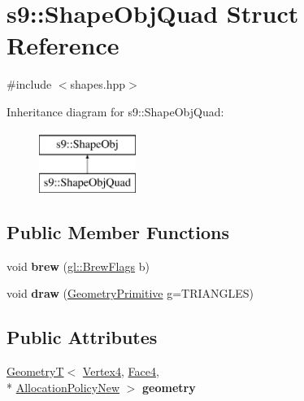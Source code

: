\hypertarget{structs9_1_1ShapeObjQuad}{\section{s9\-:\-:Shape\-Obj\-Quad Struct Reference}
\label{structs9_1_1ShapeObjQuad}
}


{\ttfamily \#include $<$shapes.\-hpp$>$}

Inheritance diagram for s9\-:\-:Shape\-Obj\-Quad\-:\begin{figure}[H]
\begin{center}
\leavevmode
\includegraphics[height=2.000000cm]{structs9_1_1ShapeObjQuad}
\end{center}
\end{figure}
\subsection*{Public Member Functions}
\begin{DoxyCompactItemize}
\item 
\hypertarget{structs9_1_1ShapeObjQuad_aac2368d50d2a0d14dd189dd100337f9e}{void {\bfseries brew} (\hyperlink{structs9_1_1gl_1_1BrewFlags}{gl\-::\-Brew\-Flags} b)}\label{structs9_1_1ShapeObjQuad_aac2368d50d2a0d14dd189dd100337f9e}

\item 
\hypertarget{structs9_1_1ShapeObjQuad_a515e13a9b5872d62fa0793b2bbb0908e}{void {\bfseries draw} (\hyperlink{namespaces9_ad57d1332f8fd67d23f6a1d3520ab785c}{Geometry\-Primitive} g=T\-R\-I\-A\-N\-G\-L\-E\-S)}\label{structs9_1_1ShapeObjQuad_a515e13a9b5872d62fa0793b2bbb0908e}

\end{DoxyCompactItemize}
\subsection*{Public Attributes}
\begin{DoxyCompactItemize}
\item 
\hypertarget{structs9_1_1ShapeObjQuad_ae7f0e624eac50f40414e33f633696a15}{\hyperlink{classs9_1_1GeometryT}{Geometry\-T}$<$ \hyperlink{structs9_1_1VertexT}{Vertex4}, \hyperlink{structs9_1_1FaceT}{Face4}, \\*
\hyperlink{classs9_1_1AllocationPolicyNew}{Allocation\-Policy\-New} $>$ {\bfseries geometry}}\label{structs9_1_1ShapeObjQuad_ae7f0e624eac50f40414e33f633696a15}

\end{DoxyCompactItemize}


